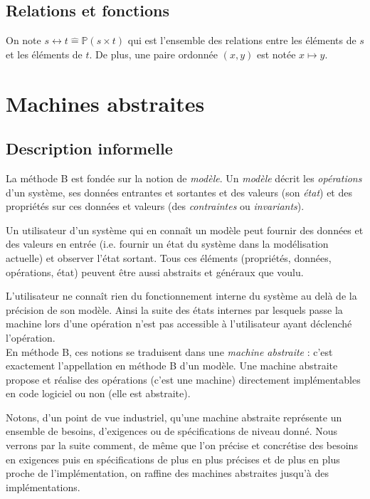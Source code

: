 \documentclass[10pt,a4paper]{article}
\newcommand{\Bequal}{\mathrel{\widehat{=}}}
\begin{document}
\subsection{Relations et fonctions}

On note  $ s \leftrightarrow t \Bequal \mathbb{P}(s \times t)$ qui est l'ensemble des relations entre les éléments de $s$ et les éléments de $t$. De plus, une paire ordonnée $(x, y)$ est notée $x \mapsto y$.

\section{Machines abstraites}

\subsection{Description informelle}

La méthode B est fondée sur la notion de \emph{modèle}. Un \emph{modèle} décrit les \emph{opérations} d'un système, ses données entrantes et sortantes et des valeurs (son \emph{état}) et des propriétés sur ces données et valeurs (des \emph{contraintes} ou \emph{invariants}).

Un utilisateur d'un système qui en connaît un modèle peut fournir des données et des valeurs en entrée (i.e. fournir un état du système dans la modélisation actuelle) et observer l'état sortant. Tous ces  éléments (propriétés, données, opérations, état) peuvent être aussi abstraits et généraux que voulu.

L'utilisateur ne connaît rien du fonctionnement interne du système au delà de la précision de son modèle. Ainsi la suite des états internes par lesquels passe la machine lors d'une opération n'est pas accessible à l'utilisateur ayant déclenché l'opération.
\\

En méthode B, ces notions se traduisent dans une \emph{machine abstraite} : c'est exactement l'appellation en méthode B d'un modèle. Une machine abstraite propose et réalise des opérations (c'est une machine) directement implémentables en code logiciel ou non (elle est abstraite).

Notons, d'un point de vue industriel, qu'une machine abstraite représente un ensemble de besoins, d'exigences ou de spécifications de niveau donné. Nous verrons par la suite comment, de même que l'on précise et concrétise des besoins en exigences puis en spécifications de plus en plus précises et de plus en plus proche de l'implémentation, on raffine des machines abstraites jusqu'à des implémentations.
\end{document}

